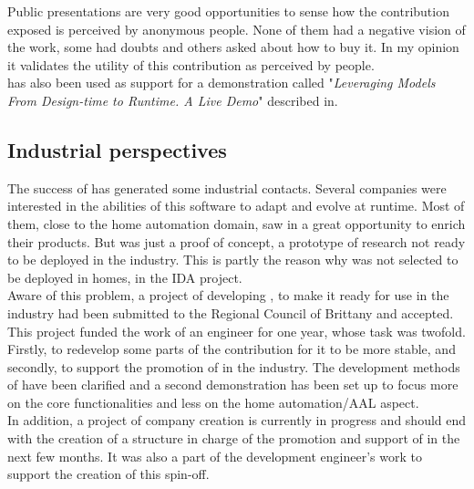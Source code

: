 Public presentations are very good opportunities to sense how the contribution exposed is perceived by anonymous people. None of them had a negative vision of the work, some had doubts and others asked about how to buy it. In my opinion it validates the utility of this contribution as perceived by people.\\

\enti{} has also been used as support for a demonstration called "{\it Leveraging Models From Design-time to Runtime. A Live Demo}" described in\cite{Morin09e}.

\subsection{Industrial perspectives}

The success of \enti{} has generated some industrial contacts. Several companies were interested in the abilities of this software to adapt and evolve at runtime. Most of them, close to the home automation domain, saw in \enti{} a great opportunity to enrich their products. But \enti{} was just a proof of concept, a prototype of research not ready to be deployed in the industry. This is partly the reason why \enti{} was not selected to be deployed in homes, in the IDA project.\\

Aware of this problem, a project of developing \enti{}, to make it ready for use in the industry had been submitted to the Regional Council of Brittany and accepted. This project funded the work of an engineer for one year, whose task was twofold. Firstly, to redevelop some parts of the contribution for it to be more stable, and secondly, to support the promotion of \enti{} in the industry. The development methods of \enti{} have been clarified and a second demonstration has been set up to focus more on the core functionalities and less on the home automation/AAL aspect.\\

In addition, a project of company creation is currently in progress and should end with the creation of a structure in charge of the promotion and support of \enti{} in the next few months. It was also a part of the development engineer's work to support the creation of this spin-off. 






